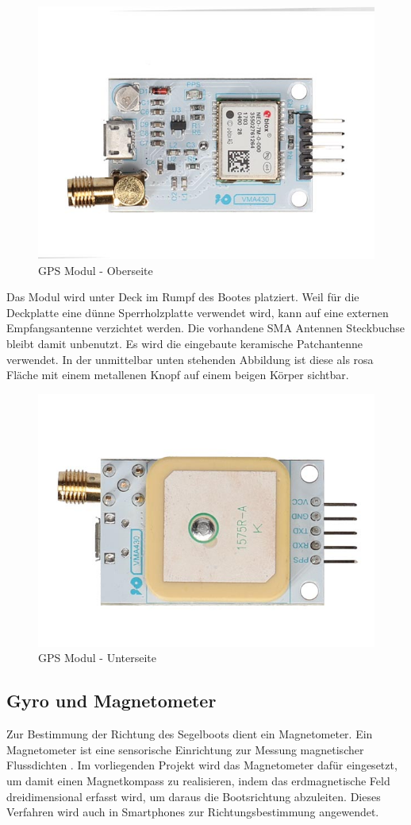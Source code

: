 \begin{figure}[H]
    \centering
    \includegraphics[width=0.75\linewidth]{vma430_front-1.jpg}
    \caption{GPS Modul - Oberseite}
    \label{fig:enter-label}
\end{figure}
Das Modul wird unter Deck im Rumpf des Bootes platziert. Weil für die Deckplatte eine dünne Sperrholzplatte verwendet wird, kann auf eine externen Empfangsantenne verzichtet werden. Die vorhandene SMA Antennen Steckbuchse bleibt damit unbenutzt. Es wird die eingebaute keramische Patchantenne verwendet. In der unmittelbar unten stehenden Abbildung ist diese als rosa Fläche mit einem metallenen Knopf auf einem beigen Körper sichtbar.
\begin{figure}[H]
    \centering
    \includegraphics[width=0.5\linewidth]{vma430_back-1.jpg}
    \caption{GPS Modul - Unterseite}
    \label{fig:enter-label}
\end{figure}

\subsection{Gyro und Magnetometer}

Zur Bestimmung der Richtung des Segelboots dient ein Magnetometer. Ein Magnetometer ist eine sensorische Einrichtung zur Messung magnetischer Flussdichten \cite{noauthor_magnetometer_2023}. Im vorliegenden Projekt wird das Magnetometer dafür eingesetzt, um damit einen Magnetkompass zu realisieren, indem das erdmagnetische Feld dreidimensional erfasst wird, um daraus die Bootsrichtung abzuleiten. Dieses Verfahren wird auch in Smartphones zur Richtungsbestimmung angewendet.

